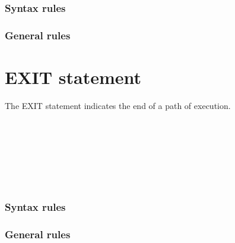 \subsubsection{Syntax rules}

\subsubsection{General rules}

\section{EXIT statement}

The EXIT statement indicates the end of a path of execution.

\begin{syntax}
  \begin{0-1}
     \\
     \\

    \begin{0-1}
    \end{0-1} \\

     \\

     \\
  \end{0-1}
\end{syntax}

\subsubsection{Syntax rules}

\subsubsection{General rules}

